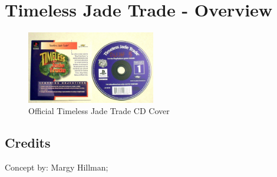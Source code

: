 \chapter{Timeless Jade Trade - Overview}

\begin{figure}[H]
    \centering
    \includegraphics[width=0.5\textwidth]{./Games/TimelessJadeTrade/Images/TimelessJadeTradeCover.jpg}
    \caption{Official Timeless Jade Trade CD Cover}
\end{figure}

\section{Credits}

Concept by: Margy Hillman;

